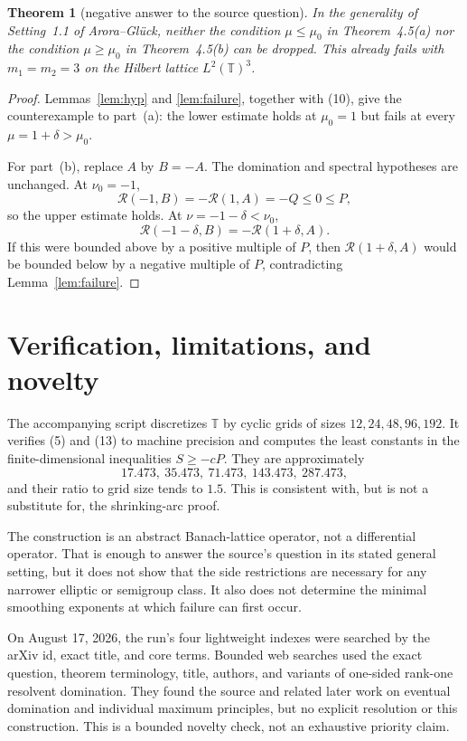 \documentclass[11pt]{article}
\newtheorem{theorem}{Theorem}
\theoremstyle{remark}
\newcommand{\T}{\mathbb T}
\newcommand{\R}{\mathcal R}
\begin{document}
\begin{theorem}[negative answer to the source question]\label{thm:main}
In the generality of Setting~1.1 of Arora--Glück, neither the condition
$\mu\leq\mu_0$ in Theorem~4.5(a) nor the condition $\mu\geq\mu_0$ in
Theorem~4.5(b) can be dropped.  This already fails with
$m_1=m_2=3$ on the Hilbert lattice $L^2(\T)^3$.
\end{theorem}

\begin{proof}
Lemmas~\ref{lem:hyp} and \ref{lem:failure}, together with (10), give the
counterexample to part~(a): the lower estimate holds at $\mu_0=1$ but fails
at every $\mu=1+\delta>\mu_0$.

For part~(b), replace $A$ by $B=-A$.  The domination and spectral hypotheses
are unchanged.  At $\nu_0=-1$,
\[
 \R(-1,B)=-\R(1,A)=-Q\leq0\leq P,
\]
so the upper estimate holds.  At $\nu=-1-\delta<\nu_0$,
\[
 \R(-1-\delta,B)=-\R(1+\delta,A).
\]
If this were bounded above by a positive multiple of $P$, then
$\R(1+\delta,A)$ would be bounded below by a negative multiple of $P$,
contradicting Lemma~\ref{lem:failure}.
\end{proof}

\section{Verification, limitations, and novelty}

The accompanying script discretizes $\T$ by cyclic grids of sizes
$12,24,48,96,192$.  It verifies (5) and (13) to machine precision and computes
the least constants in the finite-dimensional inequalities $S\geq-cP$.
They are approximately
\[
 17.473,\ 35.473,\ 71.473,\ 143.473,\ 287.473,
\]
and their ratio to grid size tends to $1.5$.  This is consistent with, but is
not a substitute for, the shrinking-arc proof.

The construction is an abstract Banach-lattice operator, not a differential
operator.  That is enough to answer the source's question in its stated
general setting, but it does not show that the side restrictions are necessary
for any narrower elliptic or semigroup class.  It also does not determine the
minimal smoothing exponents at which failure can first occur.

On August 17, 2026, the run's four lightweight indexes were searched by the
arXiv id, exact title, and core terms.  Bounded web searches used the exact
question, theorem terminology, title, authors, and variants of one-sided
rank-one resolvent domination.  They found the source and related later work
on eventual domination and individual maximum principles, but no explicit
resolution or this construction.  This is a bounded novelty check, not an
exhaustive priority claim.
\end{document}
